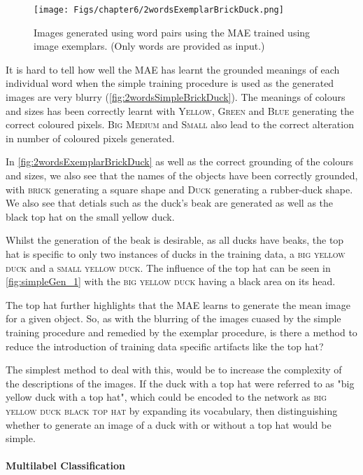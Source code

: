 \begin{figure}[ht]
    \centering
    \texttt{[image: Figs/chapter6/2wordsExemplarBrickDuck.png]}
    \caption{Images generated using word pairs using the MAE trained using image exemplars. (Only words are provided as input.)}
    \label{fig:2wordsExemplarBrickDuck}
\end{figure}


It is hard to tell how well the \ac{MAE} has learnt the grounded meanings of each individual word when the simple training procedure is used as the generated images are very blurry (\autoref{fig:2wordsSimpleBrickDuck}). The meanings of colours and sizes has been correctly learnt with \textsc{Yellow}, \textsc{Green} and  \textsc{Blue} generating the correct coloured pixels. \textsc{Big} \textsc{Medium} and \textsc{Small} also lead to the correct alteration in number of coloured pixels generated.

In \autoref{fig:2wordsExemplarBrickDuck} as well as the correct grounding of the colours and sizes, we also see that the names of the objects have been correctly grounded, with \textsc{brick} generating a square shape and \textsc{Duck} generating a rubber-duck shape. We also see that detials such as the duck's beak are generated as well as the black top hat on the small yellow duck.

Whilst the generation of the beak is desirable, as all ducks have beaks, the top hat is specific to only two instances of ducks in the training data, a \textsc{big yellow duck} and a \textsc{small yellow duck}. The influence of the top hat can be seen in \autoref{fig:simpleGen_1} with the 
\textsc{big yellow duck} having a black area on its head.

The top hat further highlights that the \ac{MAE} learns to generate the mean image for a given object. So, as with the blurring of the images cuased by the simple training procedure and remedied by the exemplar procedure, is there a method to reduce the introduction of training data specific artifacts like the top hat?

The simplest method to deal with this, would be to increase the complexity of the descriptions of the images. If the duck with a top hat were referred to as "big yellow duck with a top hat", which could be encoded to the network as \textsc{big yellow duck black top hat} by expanding its vocabulary, then distinguishing whether to generate an image of a duck with or without a top hat would be simple.


\paragraph{Multilabel Classification}


